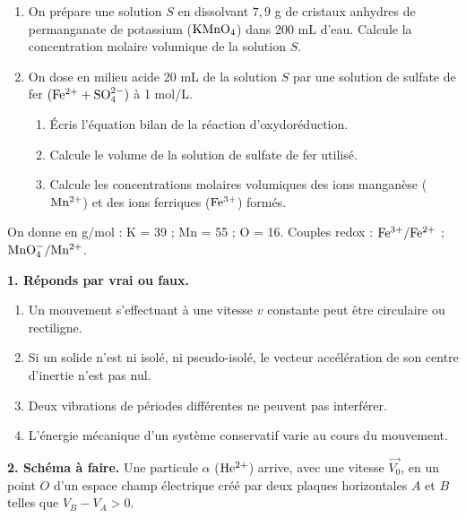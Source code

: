 \documentclass[11pt]{article}
\begin{document}
\begin{enumerate}
  \item On prépare une solution $S$ en dissolvant $7{,}9$ g de cristaux anhydres de permanganate de potassium ($\mathrm{KMnO_4}$) dans 200 mL d'eau. Calcule la concentration molaire volumique de la solution $S$.
  \item On dose en milieu acide 20 mL de la solution $S$ par une solution de sulfate de fer $(\mathrm{Fe^{2+}} + \mathrm{SO_4^{2-}})$ à 1 mol/L.
  \begin{enumerate}[label=\alph*.]
    \item Écris l'équation bilan de la réaction d'oxydoréduction.
    \item Calcule le volume de la solution de sulfate de fer utilisé.
    \item Calcule les concentrations molaires volumiques des ions manganèse ($\mathrm{Mn^{2+}}$) et des ions ferriques ($\mathrm{Fe^{3+}}$) formés.
  \end{enumerate}
\end{enumerate}
\noindent On donne en g/mol : K = 39 ; Mn = 55 ; O = 16. Couples redox : $\mathrm{Fe^{3+}/Fe^{2+}}$ ; $\mathrm{MnO_4^-/Mn^{2+}}$.



\noindent\textbf{1. Réponds par vrai ou faux.}
\begin{enumerate}[label=\alph*)]
  \item Un mouvement s'effectuant à une vitesse $v$ constante peut être circulaire ou rectiligne.
  \item Si un solide n'est ni isolé, ni pseudo-isolé, le vecteur accélération de son centre d'inertie n'est pas nul.
  \item Deux vibrations de périodes différentes ne peuvent pas interférer.
  \item L'énergie mécanique d'un système conservatif varie au cours du mouvement.
\end{enumerate}

\medskip
\noindent\textbf{2. Schéma à faire.} Une particule $\alpha$ ($\mathrm{He^{2+}}$) arrive, avec une vitesse $\vec{V_0}$, en un point $O$ d'un espace champ électrique créé par deux plaques horizontales $A$ et $B$ telles que $V_B - V_A > 0$.

\begin{center}
\end{center}
\end{document}
